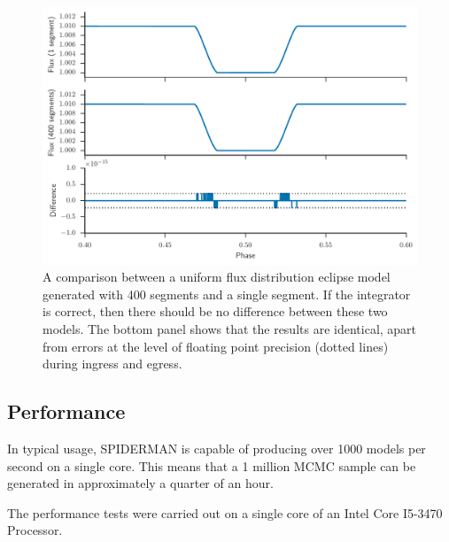 \documentclass[a4paper,fleqn,usenatbib]{mnras}
\begin{document}
\begin{figure}
\begin{center}
\includegraphics[width=\columnwidth]{img/precision.pdf}
\caption{A comparison between a uniform flux distribution eclipse model generated with 400 segments and a single segment. If the integrator is correct, then there should be no difference between these two models. The bottom panel shows that the results are identical, apart from errors at the level of floating point precision (dotted lines) during ingress and egress.}
\label{fig:precision}
\end{center}
\end{figure}

\subsection{Performance}\label{sec:performance}

In typical usage, SPIDERMAN is capable of producing over 1000 models per second on a single core. This means that a 1 million MCMC sample can be generated in approximately a quarter of an hour.

The performance tests were carried out on a single core of an Intel Core I5-3470 Processor.
\end{document}
